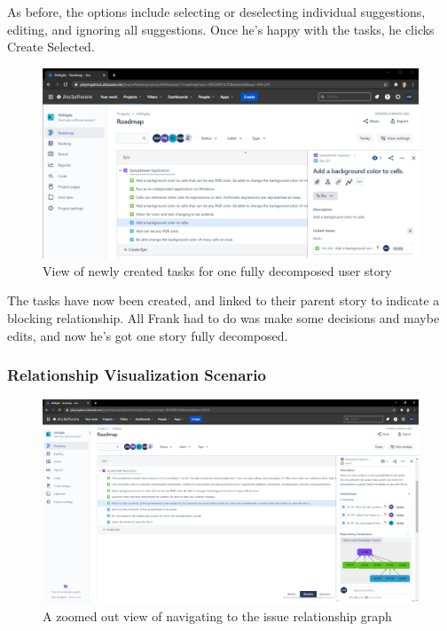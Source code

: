 As before, the options include selecting or deselecting individual suggestions, editing, and ignoring all suggestions. Once he’s happy with the tasks, he clicks Create Selected.

\begin{figure}
\centerline{\includegraphics[width=\textwidth,height=\textheight,keepaspectratio]{./figure/Scenario1Figure5.png}}
\caption{View of newly created tasks for one fully decomposed user story}
\end{figure}

The tasks have now been created, and linked to their parent story to indicate a blocking relationship. All Frank had to do was make some decisions and maybe edits, and now he’s got one story fully decomposed.

\subsubsection{Relationship Visualization Scenario}

\begin{figure}
\centerline{\includegraphics[width=\textwidth,height=\textheight,keepaspectratio]{./figure/Scenario2Figure1.png}}
\caption{A zoomed out view of navigating to the issue relationship graph}
\end{figure}

